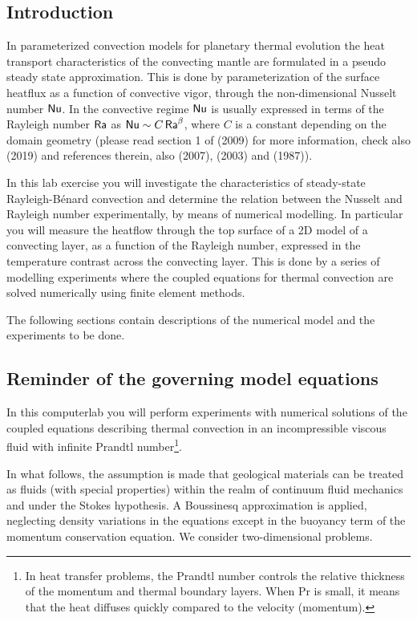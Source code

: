 
\subsection{Introduction}

In parameterized convection models for planetary thermal evolution the heat transport characteristics 
of the convecting mantle are formulated in a pseudo steady state approximation. 
This is done by parameterization of the surface heatflux as a function of convective vigor, 
through the non-dimensional Nusselt number ${\mathsf{Nu}}$. 
In the convective regime ${\mathsf{Nu}}$ is usually expressed in terms of the 
Rayleigh number ${\mathsf{Ra}}$ as ${\mathsf{Nu}} \sim C\, {\mathsf{Ra}}^\beta$, where $C$ is a 
constant depending on the domain geometry
(please read section 1 of \textcite{wodd09} (2009)
for more information, check also \textcite{plju19} (2019) and references therein, 
also \textcite{fuky07} (2007), \textcite{kore03} (2003) and \textcite{olso87} (1987)).

In this lab exercise you will investigate the characteristics of steady-state Rayleigh-B{\'e}nard convection 
and determine the relation between the Nusselt and Rayleigh number experimentally, 
by means of numerical modelling. In particular you will measure the heatflow through the top surface of 
a 2D model of a convecting layer, as a function of the Rayleigh number, expressed in the temperature 
contrast across the convecting layer. 
This is done by a series of modelling experiments where the coupled equations for thermal convection are solved 
numerically using finite element methods.

The following sections contain descriptions of the numerical model and the experiments to be done. 

\subsection{Reminder of the governing model equations}

In this computerlab you will perform experiments with numerical solutions of the 
coupled equations describing thermal convection in an 
incompressible viscous fluid with infinite Prandtl number\footnote{In heat transfer problems, 
the Prandtl number controls the relative thickness of 
the momentum and thermal boundary layers. When Pr is small, it means that the heat diffuses 
quickly compared to the velocity (momentum).}.

In what follows, the assumption is made that geological materials can be treated as fluids (with 
special properties) within the realm of continuum fluid mechanics and under the Stokes hypothesis.
A Boussinesq approximation is applied, neglecting density variations in the equations except 
in the buoyancy term of the momentum conservation equation. We consider two-dimensional problems.

